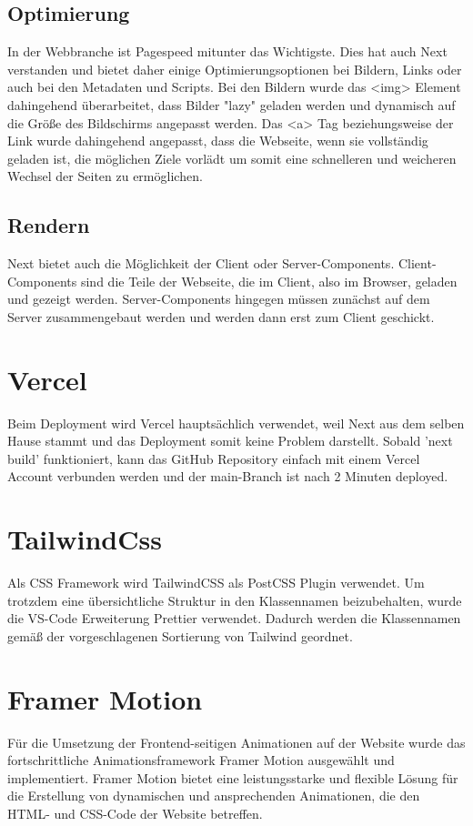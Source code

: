 \subsection{Optimierung}
In der Webbranche ist Pagespeed mitunter das Wichtigste. Dies hat auch Next verstanden und bietet daher einige Optimierungsoptionen bei Bildern, Links oder auch bei den Metadaten und Scripts. 
Bei den Bildern wurde das <img> Element dahingehend überarbeitet, dass Bilder "lazy" geladen werden und dynamisch auf die Größe des Bildschirms angepasst werden. 
Das <a> Tag beziehungsweise der Link wurde dahingehend angepasst, dass die Webseite, wenn sie vollständig geladen ist, die möglichen Ziele vorlädt um somit eine schnelleren und weicheren Wechsel der Seiten zu ermöglichen. \cite{nextjsdocsoptimizations}

\subsection{Rendern}
Next bietet auch die Möglichkeit der Client oder Server-Components. Client-Components sind die Teile der Webseite, die im Client, also im Browser, geladen und gezeigt werden.
Server-Components hingegen müssen zunächst auf dem Server zusammengebaut werden und werden dann erst zum Client geschickt. \cite{nextjsdocsrendering}

\section{Vercel}
Beim Deployment wird Vercel hauptsächlich verwendet, weil Next aus dem selben Hause stammt und das Deployment somit keine Problem darstellt.
Sobald 'next build' funktioniert, kann das GitHub Repository einfach mit einem Vercel Account verbunden werden und der main-Branch ist nach 2 Minuten deployed. \cite{vercel}

\section{TailwindCss}
Als CSS Framework wird TailwindCSS als PostCSS Plugin verwendet. 
Um trotzdem eine übersichtliche Struktur in den Klassennamen beizubehalten, wurde die VS-Code Erweiterung Prettier verwendet. 
Dadurch werden die Klassennamen gemäß der vorgeschlagenen Sortierung von Tailwind geordnet.


\section{Framer Motion}
Für die Umsetzung der Frontend-seitigen Animationen auf der Website wurde das fortschrittliche Animationsframework 
Framer Motion ausgewählt und implementiert. Framer Motion bietet eine leistungsstarke und flexible Lösung für 
die Erstellung von dynamischen und ansprechenden Animationen, die den HTML- und CSS-Code der Website betreffen.

